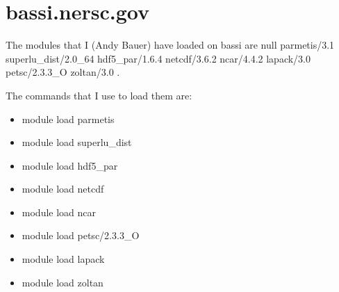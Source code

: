 \section{bassi.nersc.gov}
The modules that I (Andy Bauer) have loaded on bassi are 
null
   parmetis/3.1
   superlu\_dist/2.0\_64
   hdf5\_par/1.6.4
   netcdf/3.6.2
   ncar/4.4.2
   lapack/3.0
   petsc/2.3.3\_O
   zoltan/3.0 .

The commands that I use to load them are:
\begin{itemize}
\item module load parmetis
\item module load superlu\_dist
\item module load hdf5\_par
\item module load netcdf
\item module load ncar
\item module load petsc/2.3.3\_O
\item module load lapack
\item module load zoltan
\end{itemize}

